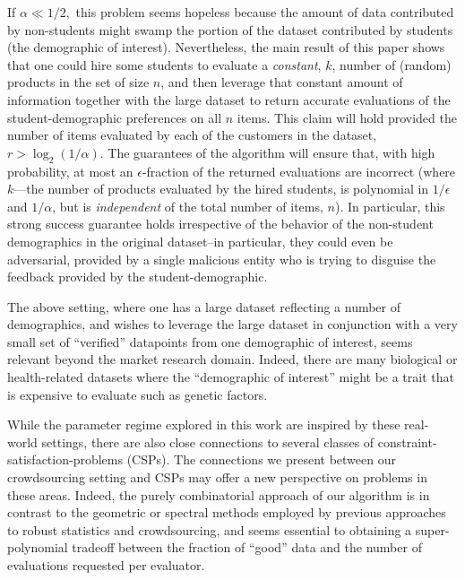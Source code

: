 \documentclass[final,12pt]{colt2018}
\newcommand{\eps}{\epsilon}
\begin{document}
If $\alpha \ll 1/2,$ this problem seems hopeless because the amount of data contributed by non-students might swamp the portion of the dataset contributed by students (the demographic of interest).  Nevertheless, the main result of this paper shows that one could hire some students to evaluate a \emph{constant}, $k$, number of (random) products in the set of size $n$, and then leverage that constant amount of information together with the large dataset to return accurate evaluations of the student-demographic preferences on all $n$ items.  This claim will hold provided the number of items evaluated by each of the customers in the dataset, $r > \log_2 (1/\alpha)$.  The guarantees of the algorithm will ensure that, with high probability, at most an $\eps$-fraction of the returned evaluations are incorrect (where $k$---the number of products evaluated by the hired students, is polynomial in $1/\eps$ and $1/\alpha$, but is \emph{independent} of the total number of items, $n$).  In particular, this strong success guarantee holds irrespective of the behavior of the non-student demographics in the original dataset--in particular, they could even be adversarial, provided by a single malicious entity who is trying to disguise the feedback provided by the student-demographic.

The above setting, where one has a large dataset reflecting a number of demographics, and wishes to leverage the large dataset in conjunction with a very small set of ``verified'' datapoints from one demographic of interest, seems relevant beyond the market research domain. Indeed, there are many biological or health-related datasets where the ``demographic of interest'' might be a trait that is expensive to evaluate such as genetic factors.  

While the parameter regime explored in this work are inspired by these real-world settings, there are also close connections to several classes of constraint-satisfaction-problems (CSPs).  The connections we present between our crowdsourcing setting and CSPs may offer a new perspective on problems in these areas. Indeed, the purely combinatorial approach of our algorithm is in contrast to the geometric or spectral methods employed by previous approaches to robust statistics and crowdsourcing, and seems essential to obtaining a super-polynomial tradeoff between the fraction of ``good'' data and the number of evaluations requested per evaluator.

\end{document}
